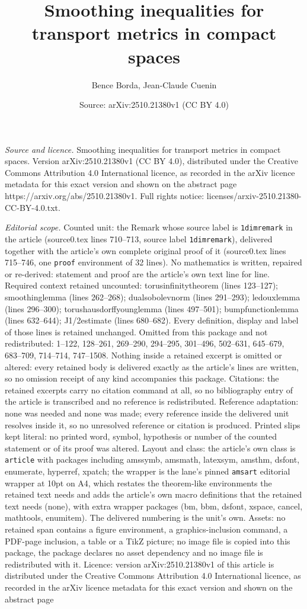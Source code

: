 \documentclass[10pt,a4paper]{amsart}
\title[Smoothing inequalities for transport metrics in compact spac]{Smoothing inequalities for transport metrics in compact spaces}
\author{Bence Borda, Jean-Claude Cuenin}
\date{Source: arXiv:2510.21380v1 (CC BY 4.0)}
\begin{document}
\maketitle

\noindent\emph{Source and licence.} Smoothing inequalities for transport metrics in compact spaces. Version arXiv:2510.21380v1 (CC BY 4.0), distributed under the Creative Commons Attribution 4.0 International licence, as recorded in the arXiv licence metadata for this exact version and shown on the abstract page https://arxiv.org/abs/2510.21380v1. Full rights notice: licenses/arxiv-2510.21380-CC-BY-4.0.txt.\par\smallskip

\noindent\textit{Editorial scope.} Counted unit: the Remark whose source label is \texttt{1dimremark} in the article (source0.tex lines 710--713, source label \texttt{1dimremark}), delivered together with the article's own complete original proof of it (source0.tex lines 715--746, one \texttt{proof} environment of 32 lines). No mathematics is written, repaired or re-derived: statement and proof are the article's own text line for line. Required context retained uncounted: torusinfinitytheorem (lines 123--127); smoothinglemma (lines 262--268); dualsobolevnorm (lines 291--293); ledouxlemma (lines 296--300); torushausdorffyounglemma (lines 497--501); bumpfunctionlemma (lines 632--644); J1/2estimate (lines 680--682). Every definition, display and label of those lines is retained unchanged. Omitted from this package and not redistributed: 1--122, 128--261, 269--290, 294--295, 301--496, 502--631, 645--679, 683--709, 714--714, 747--1508. Nothing inside a retained excerpt is omitted or altered: every retained body is delivered exactly as the article's lines are written, so no omission receipt of any kind accompanies this package. Citations: the retained excerpts carry no citation command at all, so no bibliography entry of the article is transcribed and no reference is redistributed. Reference adaptation: none was needed and none was made; every reference inside the delivered unit resolves inside it, so no unresolved reference or citation is produced. Printed slips kept literal: no printed word, symbol, hypothesis or number of the counted statement or of its proof was altered. Layout and class: the article's own class is \texttt{article} with packages including amssymb, amsmath, latexsym, amsthm, dsfont, enumerate, hyperref, xpatch; the wrapper is the lane's pinned \texttt{amsart} editorial wrapper at 10pt on A4, which restates the theorem-like environments the retained text needs and adds the article's own macro definitions that the retained text needs (none), with extra wrapper packages (bm, bbm, dsfont, xspace, cancel, mathtools, enumitem). The delivered numbering is the unit's own. Assets: no retained span contains a figure environment, a graphics-inclusion command, a PDF-page inclusion, a table or a TikZ picture; no image file is copied into this package, the package declares no asset dependency and no image file is redistributed with it. Licence: version arXiv:2510.21380v1 of this article is distributed under the Creative Commons Attribution 4.0 International licence, as recorded in the arXiv licence metadata for this exact version and shown on the abstract page 
\end{document}
